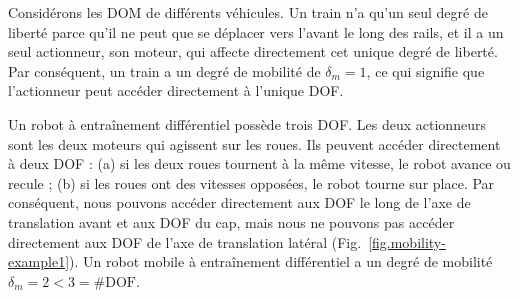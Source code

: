 Considérons les DOM de différents véhicules. Un train n'a qu'un seul degré de liberté parce qu'il ne peut que se déplacer vers l'avant le long des rails, et il a un seul actionneur, son moteur, qui affecte directement cet unique degré de liberté. Par conséquent, un train a un degré de mobilité de $\delta_m = 1$, ce qui signifie que l'actionneur peut accéder directement à l'unique DOF.

Un robot à entraînement différentiel possède trois DOF. Les deux actionneurs sont les deux moteurs qui agissent sur les roues. Ils peuvent accéder directement à deux DOF : (a) si les deux roues tournent à la même vitesse, le robot avance ou recule ; (b) si les roues ont des vitesses opposées, le robot tourne sur place. Par conséquent, nous pouvons accéder directement aux DOF le long de l'axe de translation avant et aux DOF du cap, mais nous ne pouvons pas accéder directement aux DOF de l'axe de translation latéral (Fig.~\ref{fig.mobility-example1}). Un robot mobile à entraînement différentiel a un degré de mobilité $\delta_m = 2 < 3 = \#\textrm{DOF}$.

